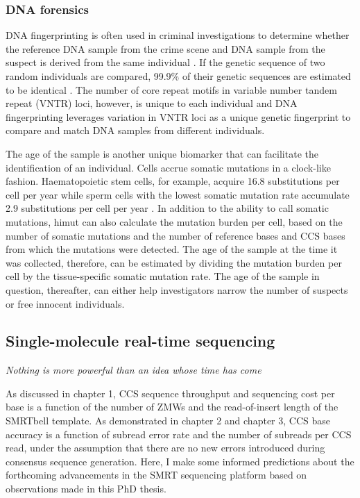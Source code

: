 \subsubsection{DNA forensics}

DNA fingerprinting is often used in criminal investigations to determine whether the reference DNA sample from the crime scene and DNA sample from the suspect is derived from the same individual \cite{}. If the genetic sequence of two random individuals are compared, 99.9\% of their genetic sequences are estimated to be identical \cite{}. The number of core repeat motifs in variable number tandem repeat (VNTR) loci, however, is unique to each individual and DNA fingerprinting leverages variation in VNTR loci as a unique genetic fingerprint to compare and match DNA samples from different individuals. 

The age of the sample is another unique biomarker that can facilitate the identification of an individual. Cells accrue somatic mutations in a clock-like fashion. Haematopoietic stem cells, for example, acquire 16.8 substitutions per cell per year \cite{} while sperm cells with the lowest somatic mutation rate accumulate 2.9 substitutions per cell per year \cite{}. In addition to the ability to call somatic mutations, himut can also calculate the mutation burden per cell, based on the number of somatic mutations and the number of reference bases and CCS bases from which the mutations were detected. The age of the sample at the time it was collected, therefore, can be estimated by dividing the mutation burden per cell by the tissue-specific somatic mutation rate. The age of the sample in question, thereafter, can either help investigators narrow the number of suspects or free innocent individuals.  

\subsection{Single-molecule real-time sequencing}

\textit{Nothing is more powerful than an idea whose time has come}
\begin{flushright}  \end{flushright} 

As discussed in chapter 1, CCS sequence throughput and sequencing cost per base is a function of the number of ZMWs and the read-of-insert length of the SMRTbell template. As demonstrated in chapter 2 and chapter 3, CCS base accuracy is a function of subread error rate and the number of subreads per CCS read, under the assumption that there are no new errors introduced during consensus sequence generation. Here, I make some informed predictions about the forthcoming advancements in the SMRT sequencing platform based on observations made in this PhD thesis.

